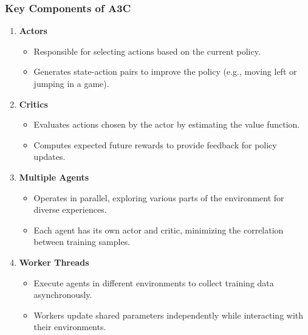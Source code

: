 \documentclass{beamer}
\begin{document}
\begin{frame}[fragile]
    \frametitle{Key Components of A3C}
    
    \begin{enumerate}
        \item \textbf{Actors}
            \begin{itemize}
                \item Responsible for selecting actions based on the current policy.
                \item Generates state-action pairs to improve the policy (e.g., moving left or jumping in a game).
            \end{itemize}
        
        \item \textbf{Critics}
            \begin{itemize}
                \item Evaluates actions chosen by the actor by estimating the value function.
                \item Computes expected future rewards to provide feedback for policy updates.
            \end{itemize}
        
        \item \textbf{Multiple Agents}
            \begin{itemize}
                \item Operates in parallel, exploring various parts of the environment for diverse experiences.
                \item Each agent has its own actor and critic, minimizing the correlation between training samples.
            \end{itemize}
        
        \item \textbf{Worker Threads}
            \begin{itemize}
                \item Execute agents in different environments to collect training data asynchronously.
                \item Workers update shared parameters independently while interacting with their environments.
            \end{itemize}
    \end{enumerate}
\end{frame}
\end{document}
